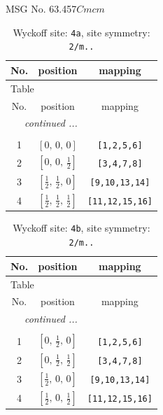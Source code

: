 \documentclass[fleqn,8pt]{jsarticle}
\begin{document}
\setcounter{MaxMatrixCols}{32}

\renewcommand{\tablename}{Table~}
\renewcommand{\figurename}{Figure~}
\begin{center}
\LARGE
MSG No. 63.457\quad$Cmcm$
\end{center}
\renewcommand{\arraystretch}{1.2}
\begin{longtable}{ccc}
\caption{Wyckoff site: {\tt 4a}, site symmetry: {\tt 2/m..}}
 \\
 \hline \hline
No. & position & mapping \\ \hline \endfirsthead

\multicolumn{2}{l}{\tablename\ \thetable{}} \\
 \hline \hline
No. & position & mapping \\ \hline \endhead

 \hline \hline
\multicolumn{2}{r}{\footnotesize\it continued ...} \\ \endfoot

 \hline \hline
\multicolumn{2}{r}{} \\ \endlastfoot

1 & $\left[ 0,\, 0,\, 0 \right]$ & {\tt [1,2,5,6]} \\ \hline
2 & $\left[ 0,\, 0,\, \frac{1}{2} \right]$ & {\tt [3,4,7,8]} \\ \hline
3 & $\left[ \frac{1}{2},\, \frac{1}{2},\, 0 \right]$ & {\tt [9,10,13,14]} \\ \hline
4 & $\left[ \frac{1}{2},\, \frac{1}{2},\, \frac{1}{2} \right]$ & {\tt [11,12,15,16]} \\
\end{longtable}
\renewcommand{\arraystretch}{1.2}
\begin{longtable}{ccc}
\caption{Wyckoff site: {\tt 4b}, site symmetry: {\tt 2/m..}}
 \\
 \hline \hline
No. & position & mapping \\ \hline \endfirsthead

\multicolumn{2}{l}{\tablename\ \thetable{}} \\
 \hline \hline
No. & position & mapping \\ \hline \endhead

 \hline \hline
\multicolumn{2}{r}{\footnotesize\it continued ...} \\ \endfoot

 \hline \hline
\multicolumn{2}{r}{} \\ \endlastfoot

1 & $\left[ 0,\, \frac{1}{2},\, 0 \right]$ & {\tt [1,2,5,6]} \\ \hline
2 & $\left[ 0,\, \frac{1}{2},\, \frac{1}{2} \right]$ & {\tt [3,4,7,8]} \\ \hline
3 & $\left[ \frac{1}{2},\, 0,\, 0 \right]$ & {\tt [9,10,13,14]} \\ \hline
4 & $\left[ \frac{1}{2},\, 0,\, \frac{1}{2} \right]$ & {\tt [11,12,15,16]} \\
\end{longtable}
\end{document}
